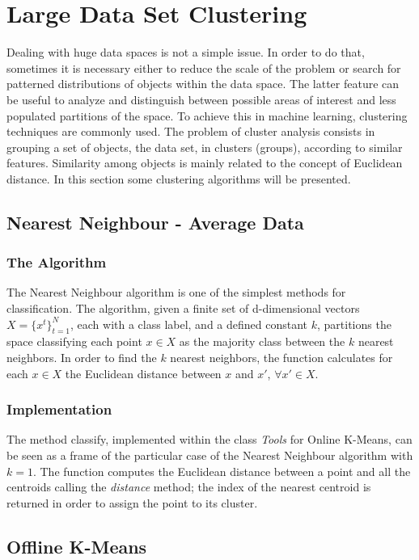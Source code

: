 \documentclass{lmproj}
\begin{document}
\section{Large Data Set Clustering}
Dealing with huge data spaces is not a simple issue. In order to do that, sometimes it is necessary either to reduce the scale of the problem or search for patterned distributions of objects within the data space. The latter feature can be useful to analyze and distinguish between possible areas of interest and less populated partitions of the space. To achieve this in machine learning, clustering techniques are commonly used. The problem of cluster analysis consists in grouping a set of objects, the data set, in clusters (groups), according to similar features. Similarity among objects is mainly related to the concept of Euclidean distance. In this section some clustering algorithms will be presented.

\subsection{Nearest Neighbour - Average Data}
\subsubsection{The Algorithm}
The Nearest Neighbour algorithm is one of the simplest methods for classification. The algorithm, given a finite set of d-dimensional vectors $X=\{x^t\}_{t=1}^{N}$, each with a class label, and a defined constant $k$, partitions the space classifying each point $x \in X$ as the majority class between the $k$ nearest neighbors. In order to find the $k$ nearest neighbors, the function calculates for each $x \in X$ the Euclidean distance between $x$ and $x'$, $\forall x' \in X$.

\subsubsection{Implementation}
The method classify, implemented within the class \textit{Tools} for Online K-Means, can be seen as a frame of the particular case of the Nearest Neighbour algorithm with $k=1$. The function computes the Euclidean distance between a point and all the centroids calling the \textit{distance} method; the index of the nearest centroid is returned in order to assign the point to its cluster.


\subsection{Offline K-Means}
\end{document}

